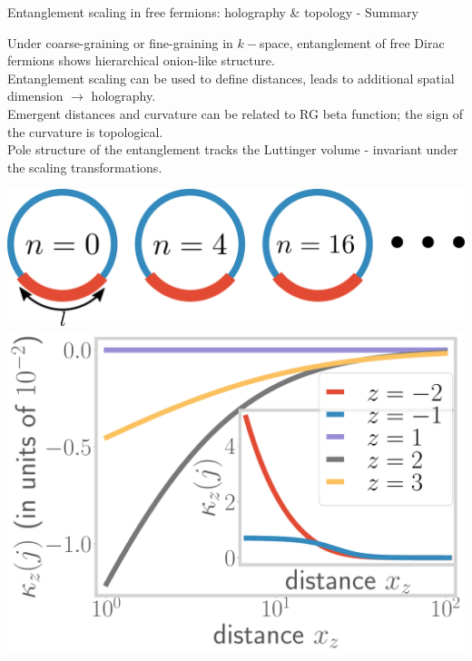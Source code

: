 \documentclass[9pt,aspectratio=169]{beamer}
\begin{document}
\begin{frame}{Entanglement scaling in free fermions: holography \& topology - Summary}
\hspace*{-40pt}
\begin{minipage}{0.65\textwidth}
\begin{itemize}
	\nitem Under coarse-graining or fine-graining in \(k-\)space, entanglement of free Dirac fermions shows hierarchical onion-like structure.\\[10pt]
	\nitem Entanglement scaling can be used to define distances, leads to additional spatial dimension \(\longrightarrow\) holography.\\[10pt]
	\nitem Emergent distances and curvature can be related to RG beta function; the sign of the curvature is topological.\\[10pt]
	\nitem Pole structure of the entanglement tracks the Luttinger volume - invariant under the scaling transformations.
\end{itemize}
\end{minipage}
\hspace*{5pt}
\begin{minipage}{0.41\textwidth}
\includegraphics[width=\textwidth]{figures/A_mi.pdf}
\includegraphics[width=\textwidth]{curvature-pos.pdf}
\end{minipage}
\hspace*{-40pt}
\end{frame}
\end{document}
